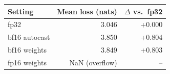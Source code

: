 \begin{tabular}{lrr}
\toprule
Setting & Mean loss (nats) & $\Delta$ vs.\ fp32 \\
\midrule
fp32 & 3.046 & +0.000 \\
bf16 autocast & 3.850 & +0.804 \\
bf16 weights & 3.849 & +0.803 \\
fp16 weights & NaN (overflow) & -- \\
\bottomrule
\end{tabular}
